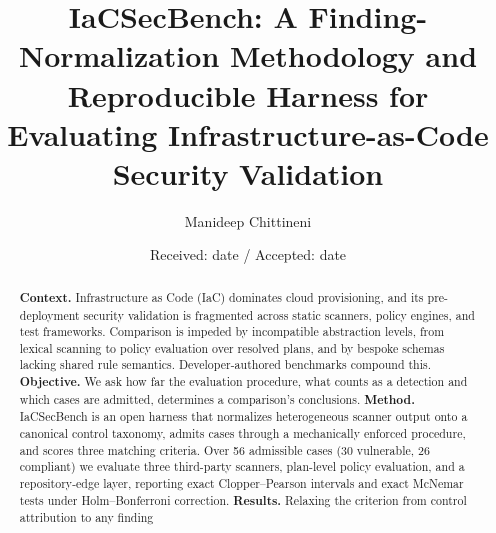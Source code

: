 \documentclass[smallextended]{svjour3}
\newcommand{\institute}[1]{}
\begin{document}
\title{IaCSecBench: A Finding-Normalization Methodology and Reproducible
Harness for Evaluating Infrastructure-as-Code Security Validation}

\author{Manideep Chittineni}

\institute{M. Chittineni \at
  Senior Platform, Cloud and DevOps Engineer, United Kingdom \\
  \email{manideep.chittineni@hotmail.com}}

\date{Received: date / Accepted: date}

\maketitle

\begin{abstract}
\textbf{Context.} Infrastructure as Code (IaC) dominates cloud provisioning, and
its pre-deployment security validation is fragmented across static scanners,
policy engines, and test frameworks. Comparison is impeded by incompatible
abstraction levels, from lexical scanning to policy evaluation over resolved
plans, and by bespoke schemas lacking shared rule semantics. Developer-authored
benchmarks compound this.
\textbf{Objective.} We ask how far the evaluation procedure, what counts as a
detection and which cases are admitted, determines a comparison's conclusions.
\textbf{Method.} IaCSecBench is an open harness that normalizes heterogeneous
scanner output onto a canonical control taxonomy, admits cases through a
mechanically enforced procedure, and scores three matching criteria. Over 56
admissible cases (30 vulnerable, 26 compliant) we evaluate three third-party
scanners, plan-level policy evaluation, and a repository-edge layer, reporting
exact Clopper--Pearson intervals and exact McNemar tests under Holm--Bonferroni
correction.
\textbf{Results.} Relaxing the criterion from control attribution to any finding

\end{abstract}
\end{document}
